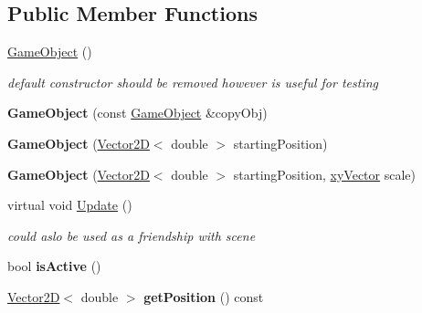 \subsection*{Public Member Functions}
\begin{DoxyCompactItemize}
\item 
\mbox{\label{class_game_object_a0348e3ee2e83d56eafca7a3547f432c4}} 
\hyperlink{class_game_object_a0348e3ee2e83d56eafca7a3547f432c4}{Game\+Object} ()
\begin{DoxyCompactList}\small\item\em default constructor should be removed however is useful for testing \end{DoxyCompactList}\item 
\mbox{\label{class_game_object_a4abdb4988a1aa49541cee2dc996834fc}} 
{\bfseries Game\+Object} (const \hyperlink{class_game_object}{Game\+Object} \&copy\+Obj)
\item 
\mbox{\label{class_game_object_aae2936e26f070d83d9b1c69dad5bfceb}} 
{\bfseries Game\+Object} (\hyperlink{class_vector2_d}{Vector2D}$<$ double $>$ starting\+Position)
\item 
\mbox{\label{class_game_object_a8d8c6203c094bc5d9e4c917e66b7b1e9}} 
{\bfseries Game\+Object} (\hyperlink{class_vector2_d}{Vector2D}$<$ double $>$ starting\+Position, \hyperlink{structxy_vector}{xy\+Vector} scale)
\item 
\mbox{\label{class_game_object_ac7ecc123dacaba955077420caabf5e64}} 
virtual void \hyperlink{class_game_object_ac7ecc123dacaba955077420caabf5e64}{Update} ()
\begin{DoxyCompactList}\small\item\em could aslo be used as a friendship with scene \end{DoxyCompactList}\item 
\mbox{\label{class_game_object_a7cc83eeefc6e3d112e2a7fc1fb037a9c}} 
bool {\bfseries is\+Active} ()
\item 
\mbox{\label{class_game_object_a6ddc58c7cc733a538228d4948da14b8f}} 
\hyperlink{class_vector2_d}{Vector2D}$<$ double $>$ {\bfseries get\+Position} () const

\end{DoxyCompactItemize}

